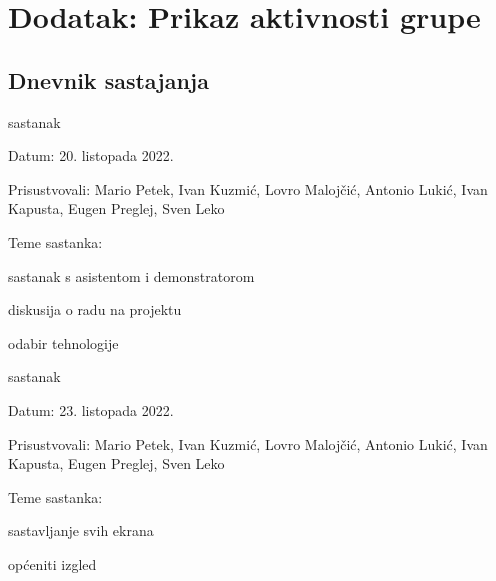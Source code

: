 \chapter*{Dodatak: Prikaz aktivnosti grupe}
		
		\section*{Dnevnik sastajanja}
		
		
		
		\begin{packed_enum}
			\item  sastanak
			\item[] \begin{packed_item}
				\item Datum: 20. listopada 2022.
				\item Prisustvovali: Mario Petek, Ivan Kuzmić, Lovro Malojčić, Antonio Lukić, Ivan Kapusta, Eugen Preglej, Sven Leko
				\item Teme sastanka:
				\begin{packed_item}
					\item  sastanak s asistentom i demonstratorom
					\item  diskusija o radu na projektu
					\item  odabir tehnologije
				\end{packed_item}
			\end{packed_item}
			
			\item  sastanak
			\item[] \begin{packed_item}
				\item Datum: 23. listopada 2022.
				\item Prisustvovali: Mario Petek, Ivan Kuzmić, Lovro Malojčić, Antonio Lukić, Ivan Kapusta, Eugen Preglej, Sven Leko
				\item Teme sastanka:
				\begin{packed_item}
					\item  sastavljanje svih ekrana
					\item  općeniti izgled
				\end{packed_item}
			\end{packed_item}
		

\end{packed_enum}
